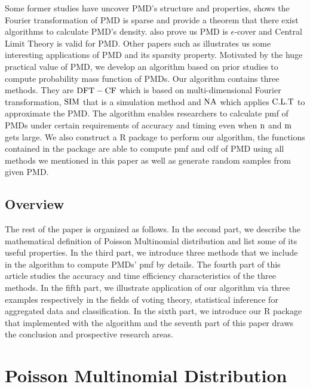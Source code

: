 \documentclass[12pt]{article}
\newcommand{\PMD}{\textrm{PMD}}
\newcommand{\SIM}{{\rm SIM}}
\newcommand{\NA}{{\rm NA}}
\newcommand{\dft}{{\rm DFT-CF}}
\begin{document}


Some former studies have uncover $\PMD$'s structure and properties,  shows the Fourier transformation of $\PMD$ is sparse and provide a theorem that there exist algorithms to calculate PMD's density.  also prove us PMD is $\epsilon$-cover and Central Limit Theory is valid for PMD. Other papers such as  illustrates us some interesting applications of PMD and its sparsity property. Motivated by the huge practical value of $\PMD$, we develop an algorithm based on prior studies to compute probability mass function of $\PMD$s. Our algorithm contains three methods. They are $\dft$ which is based on multi-dimensional Fourier transformation, $\SIM$ that is a simulation method and $\NA$ which applies ${\rm C.L.T}$ to approximate the $\PMD$. The algorithm enables researchers to calculate pmf of $\PMD$s under certain requirements of accuracy and timing even when $\rm n$ and $\rm m$ gets large. We also construct a R package to perform our algorithm, the functions contained in the package are able to compute pmf and cdf of $\PMD$ using all methods we mentioned in this paper as well as generate random samples from given $\PMD$.





\subsection{Overview}
The rest of the paper is organized as follows. In the second part, we describe the mathematical definition of Poisson Multinomial distribution and list some of its useful properties. In the third part, we introduce three methods that we include in the algorithm to compute $\PMD$s' pmf by details. The fourth part of this article studies the accuracy and time efficiency characteristics of the three methods. In the fifth part, we illustrate application of our algorithm via three examples respectively in the fields of voting theory, statistical inference for aggregated data and classification. In the sixth part, we introduce our R package that implemented with the algorithm and the seventh part of this paper draws the conclusion and prospective research areas.




\section{Poisson Multinomial Distribution}
\end{document}
